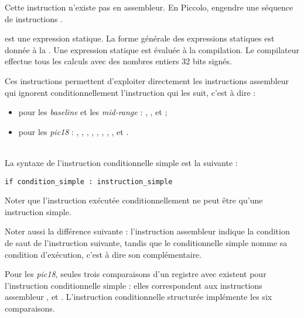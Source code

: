 
Cette instruction n'existe pas en assembleur. En Piccolo,  engendre une séquence de  instructions .

 est une expression statique. La forme générale des expressions statiques est donnée à la . Une expression statique est évaluée à la compilation. Le compilateur effectue tous les calculs avec des nombres entiers 32 bits signés.






Ces instructions permettent d'exploiter directement les instructions assembleur qui ignorent conditionnellement l'instruction qui les suit, c'est à dire :
\begin{itemize}
\item pour les \emph{baseline} et les \emph{mid-range} : , ,  et  ;
\item pour les \emph{pic18} : , , , , , , , ,  et .
\end{itemize}

~\\
La syntaxe de l'instruction conditionnelle simple est la suivante :

\begin{lstlisting}[language=piccolo]
if condition_simple : instruction_simple
\end{lstlisting}

Noter que l'instruction exécutée conditionnellement ne peut être qu'une instruction simple.

Noter aussi la différence suivante : l'instruction assembleur indique la condition de saut de l'instruction suivante, tandis que le conditionnelle simple nomme sa condition d'exécution, c'est à dire son complémentaire.

Pour les \emph{pic18}, seules trois comparaisons d'un registre avec  existent pour l'instruction conditionnelle simple : elles correspondent aux instructions assembleur ,  et . L'instruction conditionnelle structurée implémente les six comparaisons.

